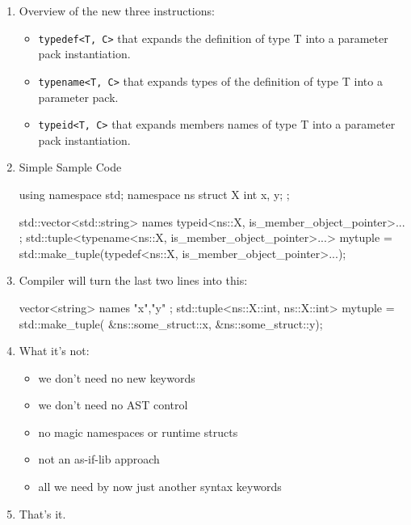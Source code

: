 \begin{enumerate}
\item Overview of the new three instructions:
\begin{itemize}
\item \texttt{typedef<T, C>} that expands the definition of type T into a parameter pack instantiation. 
\item \texttt{typename<T, C>} that expands types of the definition of type T into a parameter pack. 
\item \texttt{typeid<T, C>} that expands members names of type T into a parameter pack instantiation. 
\end{itemize}
\item Simple Sample Code
\begin{codeblock}
using namespace std;
namespace ns {
 struct X {
  int x, y;
 };
}

std::vector<std::string> names{ typeid<ns::X, is_member_object_pointer>... };
std::tuple<typename<ns::X, is_member_object_pointer>...>
     mytuple = std::make_tuple(typedef<ns::X, is_member_object_pointer>...);

\end{codeblock}
\item Compiler will turn the last two lines into this:
\begin{codeblock}
vector<string> names { "x","y" };
std::tuple<ns::X::int, ns::X::int>
       mytuple = std::make_tuple(
                &ns::some_struct::x,
                &ns::some_struct::y);
\end{codeblock}
\item What it's not:
\begin{itemize}
	\item we don't need no new keywords
	\item we don't need no AST control
	\item no magic namespaces or runtime structs
	\item not an as-if-lib approach
	\item all we need by now just another syntax keywords
\end{itemize}
\item That's it.
\end{enumerate}
